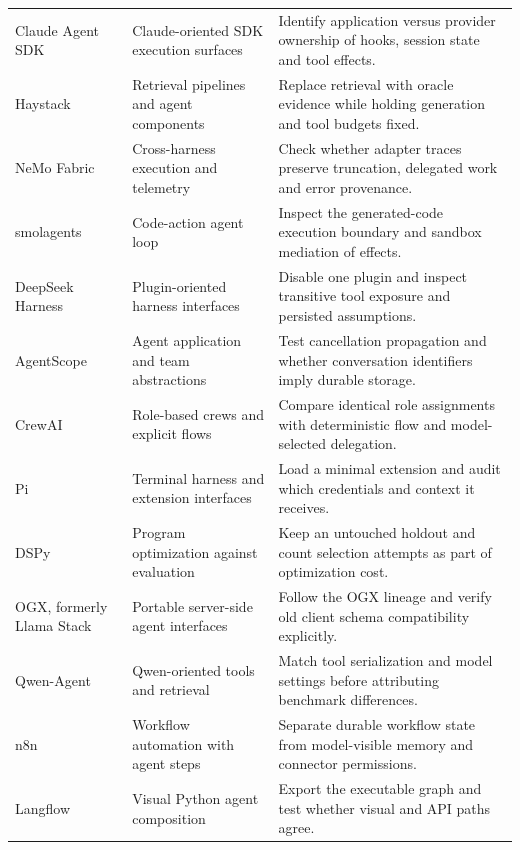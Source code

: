 \begin{longtable}{L{25mm}L{35mm}L{48mm}}
Claude Agent SDK\cite{executionproduct020} & Claude-oriented SDK execution surfaces & Identify application versus provider ownership of hooks, session state and tool effects. \\
Haystack\cite{executionproduct026} & Retrieval pipelines and agent components & Replace retrieval with oracle evidence while holding generation and tool budgets fixed. \\
NeMo Fabric\cite{executionproduct031} & Cross-harness execution and telemetry & Check whether adapter traces preserve truncation, delegated work and error provenance. \\
smolagents\cite{executionproduct032} & Code-action agent loop & Inspect the generated-code execution boundary and sandbox mediation of effects. \\
DeepSeek Harness\cite{executionproduct035} & Plugin-oriented harness interfaces & Disable one plugin and inspect transitive tool exposure and persisted assumptions. \\
AgentScope\cite{executionproduct039} & Agent application and team abstractions & Test cancellation propagation and whether conversation identifiers imply durable storage. \\
CrewAI\cite{executionproduct041} & Role-based crews and explicit flows & Compare identical role assignments with deterministic flow and model-selected delegation. \\
Pi\cite{executionproduct049} & Terminal harness and extension interfaces & Load a minimal extension and audit which credentials and context it receives. \\
DSPy\cite{executionproduct052} & Program optimization against evaluation & Keep an untouched holdout and count selection attempts as part of optimization cost. \\
OGX, formerly Llama Stack\cite{executionproduct054} & Portable server-side agent interfaces & Follow the OGX lineage and verify old client schema compatibility explicitly. \\
Qwen-Agent\cite{executionproduct056} & Qwen-oriented tools and retrieval & Match tool serialization and model settings before attributing benchmark differences. \\
n8n\cite{executionproduct057} & Workflow automation with agent steps & Separate durable workflow state from model-visible memory and connector permissions. \\
Langflow\cite{executionproduct062} & Visual Python agent composition & Export the executable graph and test whether visual and API paths agree. \\

\end{longtable}
